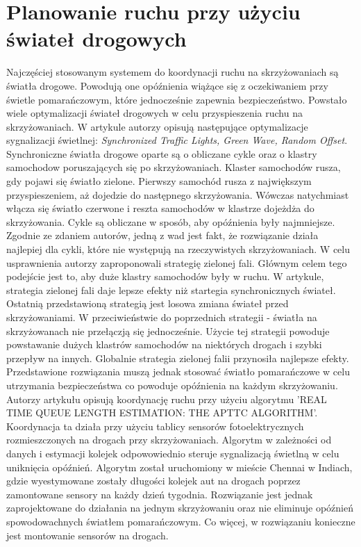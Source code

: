 \section{Planowanie ruchu przy użyciu świateł drogowych}

\indent
Najczęściej stosowanym systemem do koordynacji ruchu na skrzyżowaniach są światła drogowe. Powodują one opóźnienia wiążące się z oczekiwaniem przy świetle pomarańczowym, które jednocześnie zapewnia bezpieczeństwo. Powstało wiele optymalizacji świateł drogowych w celu przyspieszenia ruchu na skrzyżowaniach.
\newline
\indent
W artykule \cite{brockfeld2001optimizing} autorzy opisują następujące optymalizacje sygnalizacji świetlnej: \textit{Synchronized Traffic Lights, Green Wave, Random Offset}. Synchroniczne światła drogowe oparte są o obliczane cykle oraz o klastry samochodow poruszających się po skrzyżowaniach. Klaster samochodów rusza, gdy pojawi się światło zielone. Pierwszy samochód rusza z największym przyspieszeniem, aż dojedzie do następnego skrzyżowania. Wówczas natychmiast włącza się światło czerwone i reszta samochodów w klastrze dojeżdża do skrzyżowania. Cykle są obliczane w sposób, aby opóźnienia były najmniejsze. Zgodnie ze zdaniem autorów, jedną z wad jest fakt, że rozwiązanie działa najlepiej dla cykli, które nie występują na rzeczywistych skrzyżowaniach. W celu usprawnienia autorzy zaproponowali strategię zielonej fali. Głównym celem tego podejście jest to, aby duże klastry samochodów były w ruchu. W artykule, strategia zielonej fali daje lepsze efekty niż startegia synchronicznych świateł. Ostatnią przedstawioną strategią jest losowa zmiana świateł przed skrzyżowaniami. W przeciwieństwie do poprzednich strategii - światła na skrzyżowanach nie przełączją się jednocześnie. Użycie tej strategii powoduje powstawanie dużych klastrów samochodów na niektórych drogach i szybki przepływ na innych. Globalnie strategia zielonej falii przynosiła najlepsze efekty. Przedstawione rozwiązania muszą jednak stosować światło pomarańczowe w celu utrzymania bezpieczeństwa co powoduje opóźnienia na każdym skrzyżowaniu.
\newline
\indent
Autorzy artykułu \cite{athmaraman2005adaptive} opisują koordynację ruchu przy użyciu algorytmu 'REAL TIME QUEUE LENGTH ESTIMATION: THE APTTC ALGORITHM'. Koordynacja ta działa przy użyciu tablicy sensorów fotoelektrycznych rozmieszczonych na drogach przy skrzyżowaniach. Algorytm w zależności od danych i estymacji kolejek odpowowiednio steruje sygnalizacją świetlną w celu uniknięcia opóźnień. Algorytm został uruchomiony w mieście Chennai w Indiach, gdzie wyestymowane zostały długości kolejek aut na drogach poprzez zamontowane sensory na każdy dzień tygodnia. Rozwiązanie jest jednak zaprojektowane do działania na jednym skrzyżowaniu oraz nie eliminuje opóźnień spowodowachnych światłem pomarańczowym. Co więcej, w rozwiązaniu konieczne jest montowanie sensorów na drogach.
